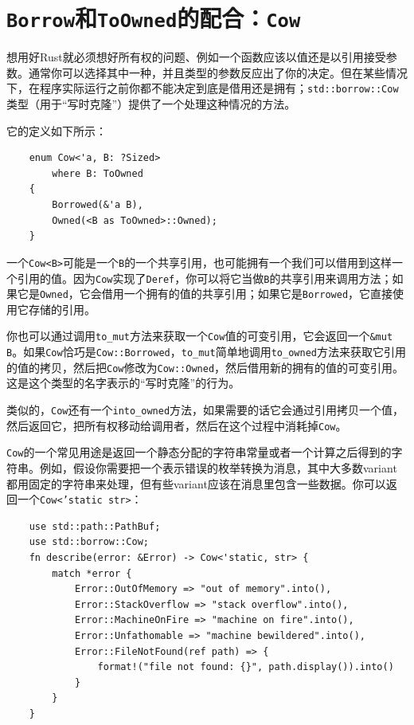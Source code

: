 \section{\texttt{Borrow}和\texttt{ToOwned}的配合：\texttt{Cow}}\label{Cow}

想用好Rust就必须想好所有权的问题、例如一个函数应该以值还是以引用接受参数。通常你可以选择其中一种，并且类型的参数反应出了你的决定。但在某些情况下，在程序实际运行之前你都不能决定到底是借用还是拥有；\texttt{std::borrow::Cow}类型（用于“写时克隆”）提供了一个处理这种情况的方法。

它的定义如下所示：
\begin{verbatim}
    enum Cow<'a, B: ?Sized>
        where B: ToOwned
    {
        Borrowed(&'a B),
        Owned(<B as ToOwned>::Owned);
    }
\end{verbatim}

一个\texttt{Cow<B>}可能是一个\texttt{B}的一个共享引用，也可能拥有一个我们可以借用到这样一个引用的值。因为\texttt{Cow}实现了\texttt{Deref}，你可以将它当做\texttt{B}的共享引用来调用方法；如果它是\texttt{Owned}，它会借用一个拥有的值的共享引用；如果它是\texttt{Borrowed}，它直接使用它存储的引用。

你也可以通过调用\texttt{to\_mut}方法来获取一个\texttt{Cow}值的可变引用，它会返回一个\texttt{\&mut B}。如果\texttt{Cow}恰巧是\texttt{Cow::Borrowed}，\texttt{to\_mut}简单地调用\texttt{to\_owned}方法来获取它引用的值的拷贝，然后把\texttt{Cow}修改为\texttt{Cow::Owned}，然后借用新的拥有的值的可变引用。这是这个类型的名字表示的“写时克隆”的行为。

类似的，\texttt{Cow}还有一个\texttt{into\_owned}方法，如果需要的话它会通过引用拷贝一个值，然后返回它，把所有权移动给调用者，然后在这个过程中消耗掉\texttt{Cow}。

\texttt{Cow}的一个常见用途是返回一个静态分配的字符串常量或者一个计算之后得到的字符串。例如，假设你需要把一个表示错误的枚举转换为消息，其中大多数variant都用固定的字符串来处理，但有些variant应该在消息里包含一些数据。你可以返回一个\texttt{Cow<'static str>}：
\begin{verbatim}
    use std::path::PathBuf;
    use std::borrow::Cow;
    fn describe(error: &Error) -> Cow<'static, str> {
        match *error {
            Error::OutOfMemory => "out of memory".into(),
            Error::StackOverflow => "stack overflow".into(),
            Error::MachineOnFire => "machine on fire".into(),
            Error::Unfathomable => "machine bewildered".into(),
            Error::FileNotFound(ref path) => {
                format!("file not found: {}", path.display()).into()
            }
        }
    }
\end{verbatim}

